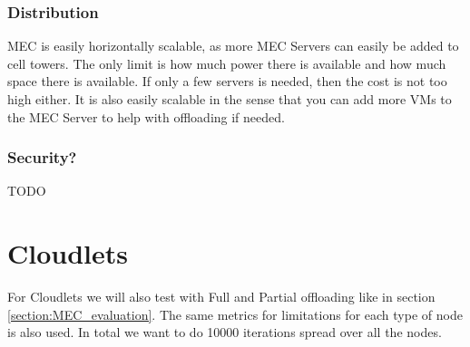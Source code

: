 \subsubsection{Distribution}
MEC is easily horizontally scalable, as more MEC Servers can easily be added to cell towers. The only limit is how much power there is available and how much space there is available. If only a few servers is needed, then the cost is not too high either. It is also easily scalable in the sense that you can add more VMs to the MEC Server to help with offloading if needed. 
\subsubsection{Security?}
TODO













\section{Cloudlets}
For Cloudlets we will also test with Full and Partial offloading like in section \ref{section:MEC_evaluation}. The same metrics for limitations for each type of node is also used. In total we want to do 10000 iterations spread over all the nodes.

